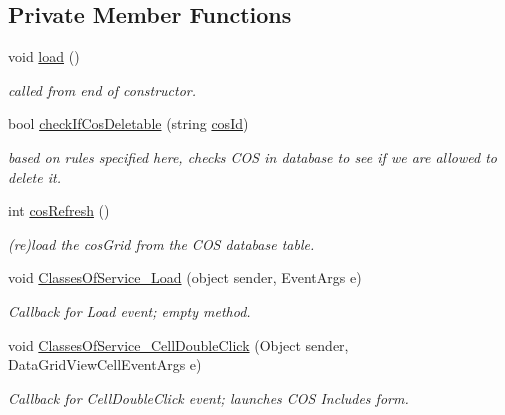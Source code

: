 \subsection*{Private Member Functions}
\begin{DoxyCompactItemize}
\item 
void \hyperlink{class_ias_pbx_config_1_1_classes_of_service_afe758d8a2d66ee16d2c23401a6c62894}{load} ()
\begin{DoxyCompactList}\small\item\em called from end of constructor. \item\end{DoxyCompactList}\item 
bool \hyperlink{class_ias_pbx_config_1_1_classes_of_service_a1c71bf32df4e9f1c83dfb22383f54188}{checkIfCosDeletable} (string \hyperlink{class_ias_pbx_config_1_1_classes_of_service_a6f26462284ed1484ad0fb62dd6c82975}{cosId})
\begin{DoxyCompactList}\small\item\em based on rules specified here, checks COS in database to see if we are allowed to delete it. \item\end{DoxyCompactList}\item 
int \hyperlink{class_ias_pbx_config_1_1_classes_of_service_ade0a8c01686723c46356a0118b50cb8a}{cosRefresh} ()
\begin{DoxyCompactList}\small\item\em (re)load the cosGrid from the COS database table. \item\end{DoxyCompactList}\item 
void \hyperlink{class_ias_pbx_config_1_1_classes_of_service_a289f97c10a4bc8cf69521227e97ed4c5}{ClassesOfService\_\-Load} (object sender, EventArgs e)
\begin{DoxyCompactList}\small\item\em Callback for Load event; empty method. \item\end{DoxyCompactList}\item 
void \hyperlink{class_ias_pbx_config_1_1_classes_of_service_af8689629d28f48c61a3136122b8fb62d}{ClassesOfService\_\-CellDoubleClick} (Object sender, DataGridViewCellEventArgs e)
\begin{DoxyCompactList}\small\item\em Callback for CellDoubleClick event; launches COS Includes form. \item\end{DoxyCompactList}\item 

\end{DoxyCompactItemize}
